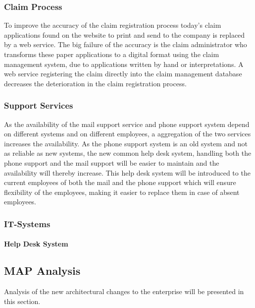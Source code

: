 \subsubsection{Claim Process}
To improve the accuracy of the claim registration process today's claim applications found on the website to print and send to the company is replaced by a web service. The big failure of the accuracy is the claim administrator who transforms these paper applications to a digital format using the claim management system, due to applications written by hand or interpretations. A web service registering the claim directly into the claim management database decreases the deterioration in the claim registration process.
\subsubsection{Support Services}
As the availability of the mail support service and phone support system depend on different systems and on different employees, a aggregation of the two services increases the availability. As the phone support system is an old system and not as reliable as new systems, the new common help desk system, handling both the phone support and the mail support will be easier to maintain and the availability will thereby increase. This help desk system will be introduced to the current employees of both the mail and the phone support which will ensure flexibility of the employees, making it easier to replace them in case of absent employees.

\subsubsection{IT-Systems}
\paragraph{Help Desk System}

\subsection{MAP Analysis}
\label{sec:map_analysis_to_be}
Analysis of the new architectural changes to the enterprise will be presented in this section.
%
